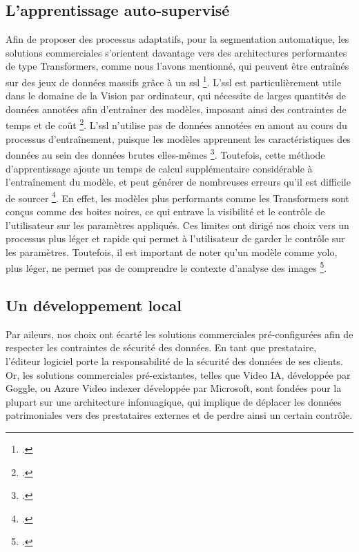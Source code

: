 \subsection{L'apprentissage auto-supervisé}
Afin de proposer des processus adaptatifs, pour la segmentation automatique, les solutions commerciales s'orientent davantage vers des architectures performantes de type \gls{Transformers}, comme nous l'avons mentionné, qui peuvent être entraînés sur des jeux de données massifs grâce à un \gls{ssl} \footcite{bergmann2025}.  L'\gls{ssl} est particulièrement utile dans le domaine de la \gls{Vision par ordinateur}, qui nécessite de larges quantités de données annotées afin d'entraîner des modèles, imposant ainsi des contraintes de temps et de coût \footcite{bergmann2025}. L'\gls{ssl} n'utilise pas de données annotées en amont au cours du processus d'entraînement, puisque les modèles apprennent les caractéristiques des données au sein des données brutes elles-mêmes \footcite{bergmann2025}. Toutefois, cette méthode d'apprentissage ajoute un temps de calcul supplémentaire considérable à l'entraînement du modèle, et peut générer de nombreuses erreurs qu'il est difficile de sourcer \footcite{kassel2026}. En effet, les modèles plus performants comme les \gls{Transformers} sont conçus comme des boites noires, ce qui entrave la visibilité et le contrôle de l'utilisateur sur les paramètres appliqués. Ces limites ont dirigé nos choix vers un processus plus léger et rapide qui permet à l'utilisateur de garder le contrôle sur les paramètres.
Toutefois, il est important de noter qu'un modèle comme \gls{yolo}, plus léger, ne permet pas de comprendre le contexte d'analyse des images \footcite{2021}. 

\subsection{Un développement local}
Par aileurs, nos choix ont écarté les solutions commerciales pré-configurées afin de respecter les contraintes de sécurité des données. En tant que prestataire, l'éditeur logiciel porte la responsabilité de la sécurité des données de ses clients. Or, les solutions commerciales pré-existantes, telles que Video IA, développée par Goggle, ou Azure Video indexer développée par Microsoft, sont fondées pour la plupart sur une architecture infonuagique, qui implique de déplacer les données patrimoniales vers des prestataires externes et de perdre ainsi un certain contrôle. 

